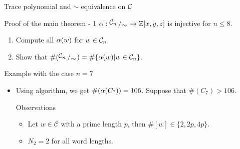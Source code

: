 \documentclass[aspectratio={169}]{beamer}
\begin{document}
\begin{frame}{Trace polynomial and $\sim$ equivalence on $\mathcal{C}$}
\begin{block}{Proof of the main theorem - 1}
$\TR : \bigslant{\cwn}{\sim} \rightarrow  \mathbb{Z}[x,y,z] $
is injective for $n \leq 8.$
\end{block}
    \begin{enumerate}
        \vskip 0.5cm
        \item Compute all $\operatorname{\alpha}(w)$ for $w \in \mathcal{C}_n$.
        \vskip 0.5cm
        \item Show that $\#(\bigslant{\cwn}{\sim}) = \#\{\TR(w) \lvert w \in \cwn\}$.
        \vskip 0.3cm
    \end{enumerate}
\end{frame}
\begin{frame}{Example with the case $n=7$}
\begin{itemize}
$N_k :=$ the number of equivalence classes in $C_7$ with the size $k$
\vskip 0.5cm
\item[1] Using algorithm, we get $\#(\operatorname{\alpha}(C_7))=106 $. Suppose that $\#(C_7)>106$.
\pause
\begin{block}{Observations}
\begin{itemize}
    \item Let $w \in \mathcal{C}$ with a prime length $p$, then $\#[w] \in \{ 2, 2p, 4p\}.$
    \item $N_2 = 2$ for all word lengths.
\end{itemize}
\end{block}
\end{itemize}
\end{frame}
\end{document}
